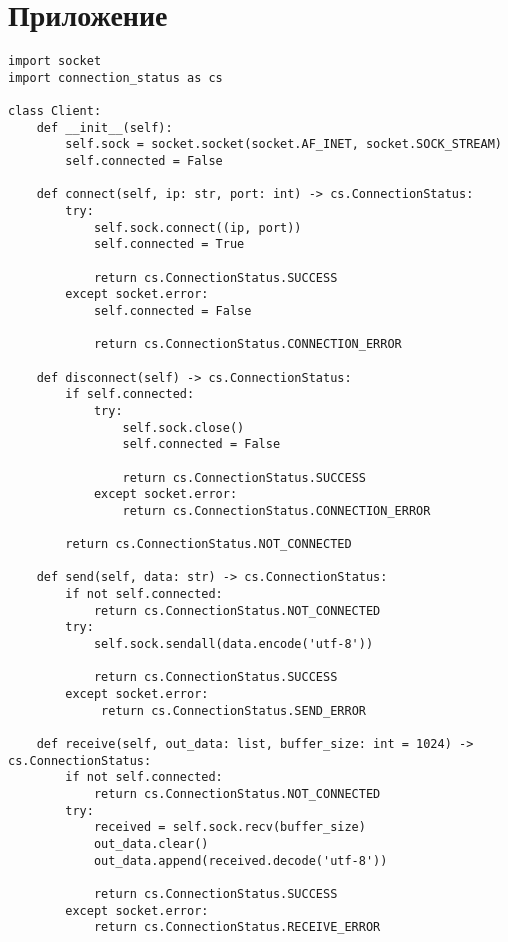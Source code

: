 \documentclass[a4paper,14pt]{extarticle}
\begin{document}
\appendix
\renewcommand{\thesection}{\Asbuk{section}}

\section{Приложение}
\begin{lstlisting}[label=lst:client, caption={Основа для общения компьютера с роботом.}]
import socket
import connection_status as cs

class Client:
    def __init__(self):
        self.sock = socket.socket(socket.AF_INET, socket.SOCK_STREAM)
        self.connected = False

    def connect(self, ip: str, port: int) -> cs.ConnectionStatus:
        try:
            self.sock.connect((ip, port))
            self.connected = True

            return cs.ConnectionStatus.SUCCESS
        except socket.error:
            self.connected = False

            return cs.ConnectionStatus.CONNECTION_ERROR

    def disconnect(self) -> cs.ConnectionStatus:
        if self.connected:
            try:
                self.sock.close()
                self.connected = False

                return cs.ConnectionStatus.SUCCESS
            except socket.error:
                return cs.ConnectionStatus.CONNECTION_ERROR
        
        return cs.ConnectionStatus.NOT_CONNECTED

    def send(self, data: str) -> cs.ConnectionStatus:
        if not self.connected:
            return cs.ConnectionStatus.NOT_CONNECTED
        try:
            self.sock.sendall(data.encode('utf-8'))

            return cs.ConnectionStatus.SUCCESS
        except socket.error:
             return cs.ConnectionStatus.SEND_ERROR

    def receive(self, out_data: list, buffer_size: int = 1024) -> cs.ConnectionStatus:
        if not self.connected:
            return cs.ConnectionStatus.NOT_CONNECTED
        try:
            received = self.sock.recv(buffer_size)
            out_data.clear()
            out_data.append(received.decode('utf-8'))

            return cs.ConnectionStatus.SUCCESS
        except socket.error:
            return cs.ConnectionStatus.RECEIVE_ERROR
\end{lstlisting}
\end{document}
